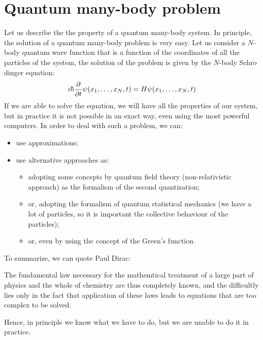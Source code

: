 \documentclass[../main/main.tex]{subfiles}
\begin{document}
\section{Quantum many-body problem}
Let us describe the the property of a quantum many-body system.
In principle, the solution of a quantum many-body problem is very easy. Let us consider a \( N \)-body quantum wave function that is a function of the coordinates of all the particles of the system, the solution of the problem is given by the \( N \)-body Schr$\ddot{o}$dinger equation:
\begin{equation*}
  i \hbar \pdv{}{t} \psi (x_1,\dots,x_N,t) = H \psi (x_1,\dots,x_N,t)
\end{equation*}
If we are able to solve the equation, we will have all the properties of our system, but in practice it is not possible in an exact way, even using the most powerful computers. In order to deal with such a problem, we can:
\begin{itemize}
\item use approximations;
\item use alternative approaches as:
  \begin{itemize}
  \item adopting some concepts by quantum field theory (non-relativistic approach) as the formalism of the second quantization;
  \item or, adopting the formalism of quantum statistical mechanics (we have a lot of particles, so it is important the collective behaviour of the particles);
  \item or, even by using the concept of the Green's function.
  \end{itemize}
\end{itemize}
To summarize, we can quote Paul Dirac:
\begin{displayquote}
The fundamental law necessary for the mathemtical treatment of a large part of physics and the whole of chemistry are thus completely known, and the difficultly lies only in the fact that application of these laws leads to equations that are too complex to be solved.
\end{displayquote}
Hence, in principle we know what we have to do, but we are unable to do it in practice.
\end{document}

